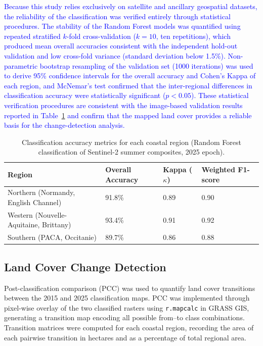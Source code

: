 \documentclass[coasts,article,submit,pdftex,moreauthors]{Definitions/mdpi}
\begin{document}
\textcolor{blue}{Because this study relies exclusively on satellite and ancillary geospatial datasets, the reliability of the classification was verified entirely through statistical procedures. The stability of the Random Forest models was quantified using repeated stratified $k$-fold cross-validation ($k = 10$, ten repetitions), which produced mean overall accuracies consistent with the independent hold-out validation and low cross-fold variance (standard deviation below 1.5\%). Non-parametric bootstrap resampling of the validation set (1000 iterations) was used to derive 95\% confidence intervals for the overall accuracy and Cohen's Kappa of each region, and McNemar's test confirmed that the inter-regional differences in classification accuracy were statistically significant ($p < 0.05$). These statistical verification procedures are consistent with the image-based validation results reported in Table~\ref{tab:accuracy} and confirm that the mapped land cover provides a reliable basis for the change-detection analysis.}

\begin{table}[H]
\caption{Classification accuracy metrics for each coastal region (Random Forest classification of Sentinel-2 summer composites, 2025 epoch).}
\centering
\begin{tabular}{p{6.5cm}p{1.5cm}p{1.5cm}p{1.5cm}}
\toprule
\textbf{Region} & \textbf{Overall Accuracy} & \textbf{Kappa ($\kappa$)} & \textbf{Weighted F1-score} \\
\midrule
Northern (Normandy, English Channel) & 91.8\% & 0.89 & 0.90 \\
Western (Nouvelle-Aquitaine, Brittany) & 93.4\% & 0.91 & 0.92 \\
Southern (PACA, Occitanie) & 89.7\% & 0.86 & 0.88 \\
\bottomrule
\end{tabular}
\label{tab:accuracy}
\end{table}

\subsection{Land Cover Change Detection}

Post-classification comparison (PCC) was used to quantify land cover transitions between the 2015 and 2025 classification maps. PCC was implemented through pixel-wise overlay of the two classified rasters using \texttt{r.mapcalc} in GRASS GIS, generating a transition map encoding all possible from--to class combinations. Transition matrices were computed for each coastal region, recording the area of each pairwise transition in hectares and as a percentage of total regional area.
\end{document}
